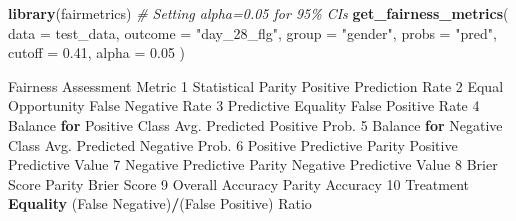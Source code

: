 \documentclass[10pt,a4paper,onecolumn]{article}
\newenvironment{Shaded}{\begin{snugshade}}{\end{snugshade}}
\newcommand{\AttributeTok}[1]{\textcolor[rgb]{0.13,0.29,0.53}{#1}}
\newcommand{\CommentTok}[1]{\textcolor[rgb]{0.56,0.35,0.01}{\textit{#1}}}
\newcommand{\ControlFlowTok}[1]{\textcolor[rgb]{0.13,0.29,0.53}{\textbf{#1}}}
\newcommand{\DecValTok}[1]{\textcolor[rgb]{0.00,0.00,0.81}{#1}}
\newcommand{\FloatTok}[1]{\textcolor[rgb]{0.00,0.00,0.81}{#1}}
\newcommand{\FunctionTok}[1]{\textcolor[rgb]{0.13,0.29,0.53}{\textbf{#1}}}
\newcommand{\NormalTok}[1]{#1}
\newcommand{\SpecialCharTok}[1]{\textcolor[rgb]{0.81,0.36,0.00}{\textbf{#1}}}
\newcommand{\StringTok}[1]{\textcolor[rgb]{0.31,0.60,0.02}{#1}}
\begin{document}
\begin{Shaded}
\begin{Highlighting}[]
\FunctionTok{library}\NormalTok{(fairmetrics)}
\CommentTok{\# Setting alpha=0.05 for 95\% CIs}
\FunctionTok{get\_fairness\_metrics}\NormalTok{(}
 \AttributeTok{data =}\NormalTok{ test\_data,}
 \AttributeTok{outcome =} \StringTok{"day\_28\_flg"}\NormalTok{,}
 \AttributeTok{group =} \StringTok{"gender"}\NormalTok{,}
 \AttributeTok{probs =} \StringTok{"pred"}\NormalTok{,}
 \AttributeTok{cutoff =} \FloatTok{0.41}\NormalTok{, }
 \AttributeTok{alpha =} \FloatTok{0.05}
\NormalTok{)}

\NormalTok{           Fairness Assessment                                 Metric}
\DecValTok{1}\NormalTok{          Statistical Parity                Positive Prediction Rate}
\DecValTok{2}\NormalTok{           Equal Opportunity                     False Negative Rate}
\DecValTok{3}\NormalTok{         Predictive Equality                     False Positive Rate}
\DecValTok{4}\NormalTok{  Balance }\ControlFlowTok{for}\NormalTok{ Positive Class           Avg. Predicted Positive Prob.}
\DecValTok{5}\NormalTok{  Balance }\ControlFlowTok{for}\NormalTok{ Negative Class           Avg. Predicted Negative Prob.}
\DecValTok{6}\NormalTok{  Positive Predictive Parity               Positive Predictive Value}
\DecValTok{7}\NormalTok{  Negative Predictive Parity               Negative Predictive Value}
\DecValTok{8}\NormalTok{          Brier Score Parity                             Brier Score}
\DecValTok{9}\NormalTok{     Overall Accuracy Parity                                Accuracy}
\DecValTok{10}\NormalTok{         Treatment }\FunctionTok{Equality}\NormalTok{ (False Negative)}\SpecialCharTok{/}\NormalTok{(False Positive) Ratio}


\end{Highlighting}
\end{Shaded}
\end{document}
